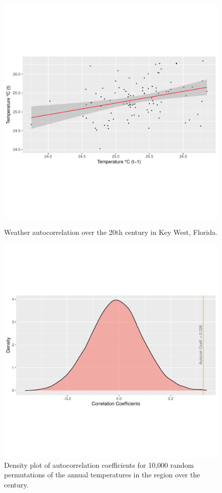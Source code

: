 \documentclass[12pt]{article}
\begin{document}
	\begin{figure}[H]
	\centering
	\vspace{-20mm} %
	\includegraphics[width=1\textwidth]{../Results/AutoCorrScatter.pdf}
	\vspace{-30mm} %
	\caption{Weather autocorrelation over the 20th century in Key West, Florida.}
	\vspace{-30mm} %
	\includegraphics[width=1\textwidth]{../Results/AutoCorrDensity.pdf}
	\vspace{-30mm} %
	\caption{Density plot of autocorrelation coefficients for 10,000 random permutations of the annual temperatures in the region over the century.}
    \end{figure}
    
\end{document}
